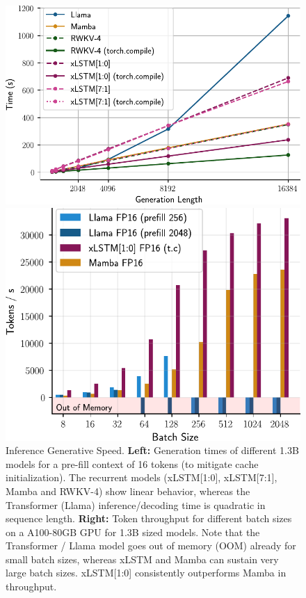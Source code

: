 \documentclass[dvipsnames]{article}
\begin{document}
\begin{figure}[H]
\centering
    \begin{minipage}{0.51\textwidth}
\includegraphics[width=\textwidth]{figures/inference_generation_time_v4b.pdf}
\end{minipage}
\hspace{0.5em}
\begin{minipage}{0.43\textwidth}
    \includegraphics[width=\textwidth]{figures/inference_decoding_throughput_bar_v5b.pdf}
\end{minipage}
\caption{Inference Generative Speed. \textbf{Left:} Generation times of different 1.3B models for a pre-fill context of 16 tokens (to mitigate cache initialization). The recurrent models (xLSTM[1:0], xLSTM[7:1], Mamba and RWKV-4) show linear behavior, whereas the Transformer (Llama) inference/decoding time is quadratic in sequence length. \label{fig:inference_time_generation}
\textbf{Right:} Token throughput for different batch sizes on a A100-80GB GPU for 1.3B sized models. Note that the Transformer / Llama model goes out of memory (OOM) already for small batch sizes, whereas xLSTM and Mamba can sustain very large batch sizes. xLSTM[1:0]  consistently outperforms Mamba in throughput.
\label{fig:inference_time_decoding_throughput}}
\end{figure}
\end{document}
